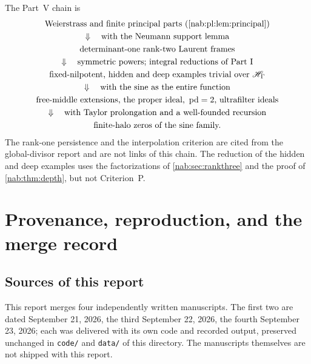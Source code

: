 \documentclass[11pt,letterpaper]{article}
\theoremstyle{definition}
\theoremstyle{remark}
\newcommand{\HH}{\mathscr H_\Gamma}
\numberwithin{equation}{section}
\begin{document}
The Part~V chain is
\[
\begin{gathered}
\text{Weierstrass and finite principal parts (\cref{nab:pl:lem:principal})}\\
\Downarrow\quad\text{with the Neumann support lemma}\\
\text{determinant-one rank-two Laurent frames}\\
\Downarrow\quad\text{symmetric powers; integral reductions of Part~I}\\
\text{fixed-nilpotent, hidden and deep examples trivial over }\HH\\
\Downarrow\quad\text{with the sine as the entire function}\\
\text{free-middle extensions, the proper ideal, }\operatorname{pd}=2
\text{, ultrafilter ideals}\\
\Downarrow\quad\text{with Taylor prolongation and a well-founded recursion}\\
\text{finite-halo zeros of the sine family.}
\end{gathered}
\]
The rank-one persistence and the interpolation criterion are cited from the
global-divisor report and are not links of this chain. The reduction of the
hidden and deep examples uses the factorizations of \cref{nab:sec:rankthree}
and the proof of \cref{nab:thm:depth}, but not Criterion~P.

\section{Provenance, reproduction, and the merge record}\label{nab:app:repro}

\subsection{Sources of this report}

This report merges four independently written manuscripts. The first two are
dated September 21, 2026, the third September 22, 2026, the fourth September 23,
2026; each was delivered with its own code and recorded output, preserved
unchanged in \texttt{code/} and \texttt{data/} of this directory. The
manuscripts themselves are not shipped with this report.
\end{document}
